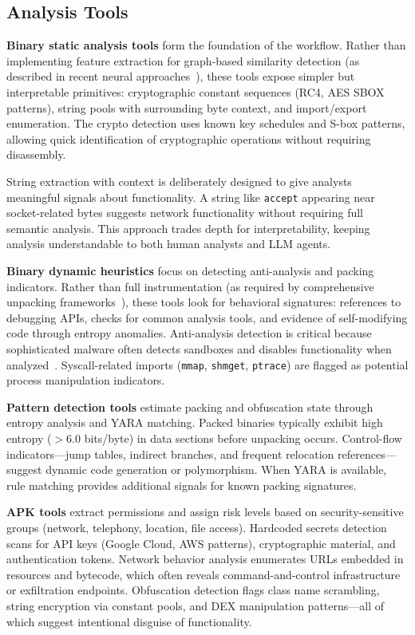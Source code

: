 \documentclass[11pt]{article}
\begin{document}
\subsection{Analysis Tools}
\textbf{Binary static analysis tools} form the foundation of the workflow. Rather than implementing feature extraction for graph-based similarity detection (as described in recent neural approaches~\cite{gemini2018}), these tools expose simpler but interpretable primitives: cryptographic constant sequences (RC4, AES SBOX patterns), string pools with surrounding byte context, and import/export enumeration. The crypto detection uses known key schedules and S-box patterns, allowing quick identification of cryptographic operations without requiring disassembly.

String extraction with context is deliberately designed to give analysts meaningful signals about functionality. A string like \texttt{accept} appearing near socket-related bytes suggests network functionality without requiring full semantic analysis. This approach trades depth for interpretability, keeping analysis understandable to both human analysts and LLM agents.

\textbf{Binary dynamic heuristics} focus on detecting anti-analysis and packing indicators. Rather than full instrumentation (as required by comprehensive unpacking frameworks~\cite{polyunpack2007}), these tools look for behavioral signatures: references to debugging APIs, checks for common analysis tools, and evidence of self-modifying code through entropy anomalies. Anti-analysis detection is critical because sophisticated malware often detects sandboxes and disables functionality when analyzed~\cite{polyunpack2007}. Syscall-related imports (\texttt{mmap}, \texttt{shmget}, \texttt{ptrace}) are flagged as potential process manipulation indicators.

\textbf{Pattern detection tools} estimate packing and obfuscation state through entropy analysis and YARA matching. Packed binaries typically exhibit high entropy ($> 6.0$ bits/byte) in data sections before unpacking occurs. Control-flow indicators—jump tables, indirect branches, and frequent relocation references—suggest dynamic code generation or polymorphism. When YARA is available, rule matching provides additional signals for known packing signatures.

\textbf{APK tools} extract permissions and assign risk levels based on security-sensitive groups (network, telephony, location, file access). Hardcoded secrets detection scans for API keys (Google Cloud, AWS patterns), cryptographic material, and authentication tokens. Network behavior analysis enumerates URLs embedded in resources and bytecode, which often reveals command-and-control infrastructure or exfiltration endpoints. Obfuscation detection flags class name scrambling, string encryption via constant pools, and DEX manipulation patterns—all of which suggest intentional disguise of functionality.
\end{document}
